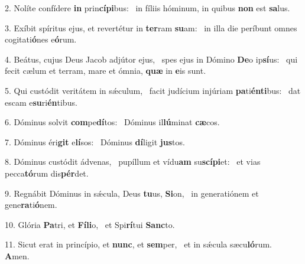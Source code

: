 2. Nolíte confídere \textbf{in} prin\textbf{cí}\textbf{pi}bus: \ast\  in fíliis hóminum, in quibus \textbf{non} est \textbf{sa}lus.\

3. Exíbit spíritus ejus, et revertétur in \textbf{ter}ram \textbf{su}am: \ast\  in illa die períbunt omnes cogitati\textbf{ó}nes e\textbf{ó}rum.\

4. Beátus, cujus Deus Jacob adjútor ejus, \dag\  spes ejus in Dómino \textbf{De}o ip\textbf{sí}us: \ast\  qui fecit cælum et terram, mare et ómnia, \textbf{quæ} in \textbf{e}is sunt.\

5. Qui custódit veritátem in sǽculum, \dag\  facit judícium injúriam \textbf{pa}ti\textbf{én}\textbf{ti}bus: \ast\  dat escam e\textbf{su}ri\textbf{én}tibus.\

6. Dóminus solvit \textbf{com}pe\textbf{dí}tos: \ast\  Dóminus il\textbf{lú}minat \textbf{cæ}cos.\

7. Dóminus éri\textbf{git} e\textbf{lí}sos: \ast\  Dóminus \textbf{dí}ligit \textbf{jus}tos.\

8. Dóminus custódit ádvenas, \dag\  pupíllum et vídu\textbf{am} su\textbf{scí}\textbf{pi}et: \ast\  et vias pecca\textbf{tó}rum dis\textbf{pér}det.\

9. Regnábit Dóminus in sǽcula, Deus \textbf{tu}us, \textbf{Si}on, \ast\  in generatiónem et gene\textbf{ra}ti\textbf{ó}nem.\

10. Glória \textbf{Pa}tri, et \textbf{Fí}\textbf{li}o, \ast\  et Spi\textbf{rí}tui \textbf{Sanc}to.\

11. Sicut erat in princípio, et \textbf{nunc}, et \textbf{sem}per, \ast\  et in sǽcula sæcu\textbf{ló}rum. \textbf{A}men.\

